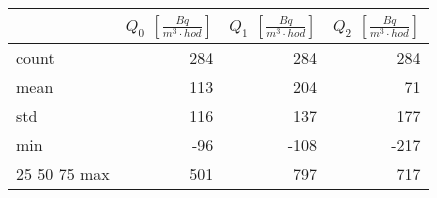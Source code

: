 \begin{tabular}{lrrr}
\toprule
{} &  $Q_0$ $\left[\si{\frac{Bq}{m^3\cdot hod}}\right]$ &  $Q_1$ $\left[\si{\frac{Bq}{m^3\cdot hod}}\right]$ &  $Q_2$ $\left[\si{\frac{Bq}{m^3\cdot hod}}\right]$ \\
\midrule
count &                                                284 &                                                284 &                                                284 \\
mean  &                                                113 &                                                204 &                                                 71 \\
std   &                                                116 &                                                137 &                                                177 \\
min   &                                                -96 &                                               -108 &                                               -217 \\
25%
50%
75%
max   &                                                501 &                                                797 &                                                717 \\
\bottomrule
\end{tabular}
